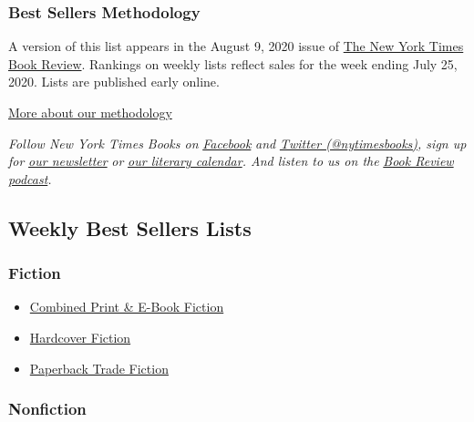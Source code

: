 \hypertarget{best-sellers-methodology}{%
\subsubsection{Best Sellers
Methodology}\label{best-sellers-methodology}}

A version of this list appears in the August 9, 2020 issue of
\href{http://www.nytimes.com/section/books/review}{The New York Times
Book Review}. Rankings on weekly lists reflect sales for the week ending
July 25, 2020. Lists are published early online.

\href{/books/best-sellers/methodology/}{More about our methodology}

\emph{Follow New York Times Books on}
\href{https://www.facebook.com/nytbooks/}{\emph{Facebook}} \emph{and}
\href{https://twitter.com/nytimesbooks}{\emph{Twitter
(@nytimesbooks)}}\emph{, sign up for}
\href{https://www.nytimes.com/newsletters/books-review}{\emph{our
newsletter}} \emph{or}
\href{https://www.nytimes.com/interactive/2017/books/books-calendar.html}{\emph{our
literary calendar}}\emph{. And listen to us on the}
\href{https://www.nytimes.com/column/book-review-podcast}{\emph{Book
Review podcast}}\emph{.}

\hypertarget{weekly-best-sellers-lists}{%
\subsection{Weekly Best Sellers Lists}\label{weekly-best-sellers-lists}}

\hypertarget{fiction}{%
\subsubsection{Fiction}\label{fiction}}

\begin{itemize}
\tightlist
\item
  \href{/books/best-sellers/combined-print-and-e-book-fiction/}{Combined
  Print \& E-Book Fiction}
\item
  \href{/books/best-sellers/hardcover-fiction/}{Hardcover Fiction}
\item
  \href{/books/best-sellers/trade-fiction-paperback/}{Paperback Trade
  Fiction}
\end{itemize}

\hypertarget{nonfiction}{%
\subsubsection{Nonfiction}\label{nonfiction}}

